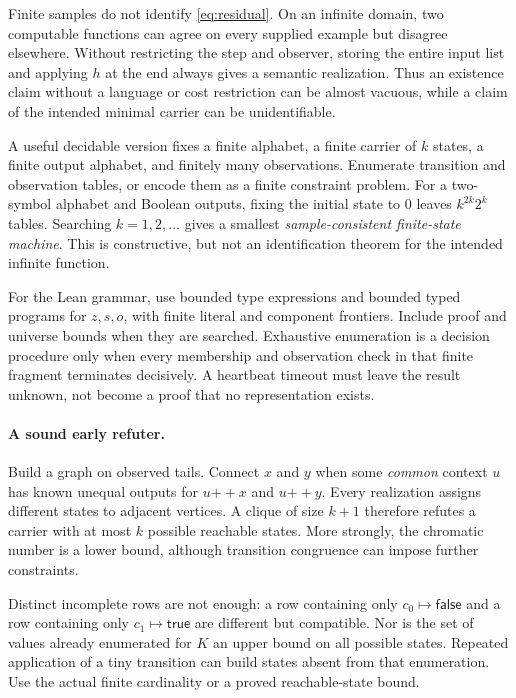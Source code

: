 Finite samples do not identify \eqref{eq:residual}. On an infinite domain,
two computable functions can agree on every supplied example but disagree
elsewhere. Without restricting the step and observer, storing the entire
input list and applying $h$ at the end always gives a semantic realization.
Thus an existence claim without a language or cost restriction can be almost
vacuous, while a claim of the intended minimal carrier can be unidentifiable.

A useful decidable version fixes a finite alphabet, a finite carrier of $k$
states, a finite output alphabet, and finitely many observations. Enumerate
transition and observation tables, or encode them as a finite constraint
problem. For a two-symbol alphabet and Boolean outputs, fixing the initial
state to $0$ leaves $k^{2k}2^k$ tables. Searching $k=1,2,\ldots$ gives a smallest
\emph{sample-consistent finite-state machine}. This is constructive, but not
an identification theorem for the intended infinite function.

For the Lean grammar, use bounded type expressions and bounded typed programs
for $z,s,o$, with finite literal and component frontiers. Include proof and
universe bounds when they are searched. Exhaustive enumeration is a decision
procedure only when every membership and observation check in that finite
fragment terminates decisively. A heartbeat timeout must leave the result
unknown, not become a proof that no representation exists.

\paragraph{A sound early refuter.}
Build a graph on observed tails. Connect $x$ and $y$ when some \emph{common}
context $u$ has known unequal outputs for $u\mathbin{+\!+}x$ and
$u\mathbin{+\!+}y$. Every realization assigns different states to adjacent
vertices. A clique of size $k+1$ therefore refutes a carrier with at most $k$
possible reachable states. More strongly, the chromatic number is a lower
bound, although transition congruence can impose further constraints.

Distinct incomplete rows are not enough: a row containing only
$c_0\mapsto\mathsf{false}$ and a row containing only
$c_1\mapsto\mathsf{true}$ are different but compatible. Nor is the set of values
already enumerated for $K$ an upper bound on all possible states. Repeated
application of a tiny transition can build states absent from that enumeration.
Use the actual finite cardinality or a proved reachable-state bound.


